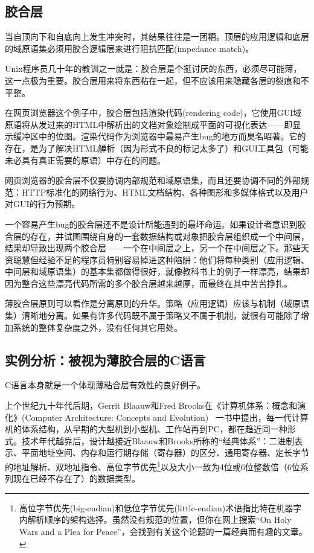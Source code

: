 \documentclass[12pt,oneside]{ctexbook}
\begin{document}
\begin{common-format}
\subsection{胶合层}
当自顶向下和自底向上发生冲突时，其结果往往是一团糟。顶层的应用逻辑和底层的域原语集必须用胶合逻辑层来进行阻抗匹配(impedance match)。

Unix程序员几十年的教训之一就是：胶合层是个挺讨厌的东西，必须尽可能薄，这一点极为重要。胶合层用来将东西粘在一起，但不应该用来隐藏各层的裂痕和不平整。

在网页浏览器这个例子中，胶合层包括渲染代码(rendering code)，它使用GUI域原语将从发过来的HTML中解析出的文档对象绘制成平面的可视化表达——即显示缓冲区中的位图。渲染代码作为浏览器中最易产生bug的地方而臭名昭著。它的存在，是为了解决HTML觯析（因为形式不良的标记太多了）和GUI工具包（可能未必具有真正需要的原语）中存在的问题。

网页浏览器的胶合层不仅要协调内部规范和域原语集，而且还要协调不同的外部规范：HTTP标准化的网络行为、HTML文档结构、各种图形和多媒体格式以及用户对GUI的行为预期。

一个容易产生bug的胶合层还不是设计所能遇到的最坏命运。如果设计者意识到胶合层的存在，并试图围绕自身的一套数据结构或对象把胶合层组织成一个中间层，结果却导致出现两个胶合层——一个在中间层之上，另一个在中间层之下。那些天资聪慧但经验不足的程序员特别容易掉进这种陷阱：他们将每种类别（应用逻辑、中间层和域原语集）的基本集都做得很好，就像教科书上的例子一样漂亮，结果却因为整合这些漂亮代码所需的多个胶合层越来越厚，而最终在其中苦苦挣扎。

薄胶合层原则可以看作是分离原则的升华。策略（应用逻辑）应该与机制（域原语集）清晰地分离。如果有许多代码既不属于策略又不属于机制，就很有可能除了增加系统的整体复杂度之外，没有任何其它用处。


\subsection{实例分析：被视为薄胶合层的C语言}
C语言本身就是一个体现薄粘合层有效性的良好例子。

上个世纪九十年代后期，Gerrit Blaauw和Fred Brooks在《计算机体系：概念和演化》(Computer Architecture:  Concepts and Evolution)  ~\cite{BlaauwBrooks}一书中提出，每一代计算机的体系结构，从早期的大型机到小型机、工作站再到PC，都在趋近同一种形式。技术年代越靠后，设计越接近Blaauw和Brooks所称的“经典体系”：二进制表示、平面地址空间、内存和运行期存储（寄存器）的区分、通用寄存器、定长字节的地址解析、双地址指令、高位字节优先\footnote{高位字节优先(big-endian)和低位字节优先(little-endian)术语指比特在机器字内解析顺序的架构选择。虽然没有规范的位置，但你在网上搜索“On Holy Wars and a Plea for Peace”，会找到有关这个论题的一篇经典而有趣的文章。}以及大小一致为4位或6位整数倍（6位系列现在已经不存在了）的数据类型。


\end{common-format}
\end{document}
